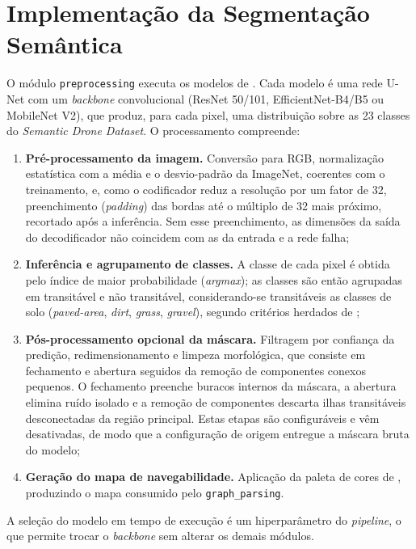 \documentclass[
    12pt,
    openright,
    oneside,
    a4paper,
    english,
    brazil
]{abntex2}
\begin{document}
\section{Implementação da Segmentação Semântica}
\label{sec:impl_segmentacao}

O módulo \texttt{preprocessing} executa os modelos de \cite{junior2024_models}. Cada modelo é uma rede U-Net \cite{ronneberger2015} com um \textit{backbone} convolucional (ResNet 50/101, EfficientNet-B4/B5 ou MobileNet V2), que produz, para cada pixel, uma distribuição sobre as 23 classes do \emph{Semantic Drone Dataset}. O processamento compreende:

\begin{enumerate}
    \item \textbf{Pré-processamento da imagem.} Conversão para RGB, normalização estatística com a média e o desvio-padrão da ImageNet, coerentes com o treinamento, e, como o codificador reduz a resolução por um fator de 32, preenchimento (\textit{padding}) das bordas até o múltiplo de 32 mais próximo, recortado após a inferência. Sem esse preenchimento, as dimensões da saída do decodificador não coincidem com as da entrada e a rede falha;
    \item \textbf{Inferência e agrupamento de classes.} A classe de cada pixel é obtida pelo índice de maior probabilidade (\textit{argmax}); as classes são então agrupadas em transitável e não transitável, considerando-se transitáveis as classes de solo (\textit{paved-area}, \textit{dirt}, \textit{grass}, \textit{gravel}), segundo critérios herdados de \cite{junior2024};
    \item \textbf{Pós-processamento opcional da máscara.} Filtragem por confiança da predição, redimensionamento e limpeza morfológica, que consiste em fechamento e abertura seguidos da remoção de componentes conexos pequenos. O fechamento preenche buracos internos da máscara, a abertura elimina ruído isolado e a remoção de componentes descarta ilhas transitáveis desconectadas da região principal. Estas etapas são configuráveis e vêm desativadas, de modo que a configuração de origem entregue a máscara bruta do modelo;
    \item \textbf{Geração do mapa de navegabilidade.} Aplicação da paleta de cores de \cite{junior2025_rrt}, produzindo o mapa consumido pelo \texttt{graph\_parsing}.
\end{enumerate}

A seleção do modelo em tempo de execução é um hiperparâmetro do \textit{pipeline}, o que permite trocar o \textit{backbone} sem alterar os demais módulos.
\end{document}
